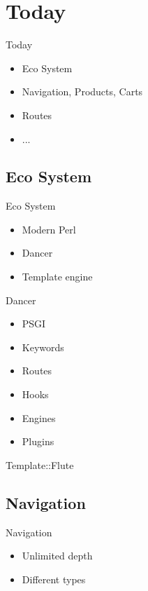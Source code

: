 \section{Today}
\begin{frame}{Today}
\begin{itemize}
\item Eco System
\item Navigation, Products, Carts
\item Routes
\item ...
\end{itemize}
\end{frame}

\subsection{Eco System}

\begin{frame}{Eco System}
\begin{itemize}
\item Modern Perl
\item Dancer
\item Template engine
\end{itemize}
\end{frame}

\begin{frame}{Dancer}
\begin{itemize}
\item PSGI
\item Keywords
\item Routes
\item Hooks
\item Engines
\item Plugins
\end{itemize}
\end{frame}


\begin{frame}{Template::Flute}
\end{frame}

\subsection{Navigation}
\begin{frame}{Navigation}
\begin{itemize}
\item Unlimited depth
\item Different types
\end{itemize}
\end{frame}

